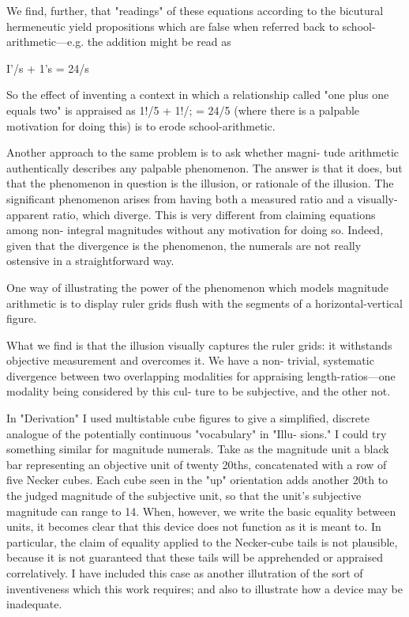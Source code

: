 We find, further, that "readings" of these equations according to 
the bicutural hermeneutic yield propositions which are false when 
referred back to school-arithmetic---e.g. the addition might be read as 


I'/s + 1's = 24/s 


So the effect of inventing a context in which a relationship called "one 
plus one equals two" is appraised as 1!/5 + 1!/; = 24/5 (where there is a 
palpable motivation for doing this) is to erode school-arithmetic. 

Another approach to the same problem is to ask whether magni- 
tude arithmetic authentically describes any palpable phenomenon. The 
answer is that it does, but that the phenomenon in question is the 
illusion, or rationale of the illusion. The significant phenomenon arises 
from having both a measured ratio and a visually-apparent ratio, which 
diverge. This is very different from claiming equations among non- 
integral magnitudes without any motivation for doing so. Indeed, given 
that the divergence is the phenomenon, the numerals are not really 
ostensive in a straightforward way. 

One way of illustrating the power of the phenomenon which 
models magnitude arithmetic is to display ruler grids flush with the 
segments of a horizontal-vertical figure. 


What we find is that the illusion visually captures the ruler grids: it 
withstands objective measurement and overcomes it. We have a non- 
trivial, systematic divergence between two overlapping modalities for 
appraising length-ratios---one modality being considered by this cul- 
ture to be subjective, and the other not. 


In "Derivation" I used multistable cube figures to give a simplified, 
discrete analogue of the potentially continuous "vocabulary" in "Illu- 
sions." I could try something similar for magnitude numerals. Take as 
the magnitude unit a black bar representing an objective unit of twenty 
20ths, concatenated with a row of five Necker cubes. Each cube seen in 
the "up" orientation adds another 20th to the judged magnitude of the 
subjective unit, so that the unit's subjective magnitude can range to 14. 
When, however, we write the basic equality between units, it becomes 
clear that this device does not function as it is meant to. In particular, 
the claim of equality applied to the Necker-cube tails is not plausible, 
because it is not guaranteed that these tails will be apprehended or 
appraised correlatively. I have included this case as another illutration 
of the sort of inventiveness which this work requires; and also to 
illustrate how a device may be inadequate. 


